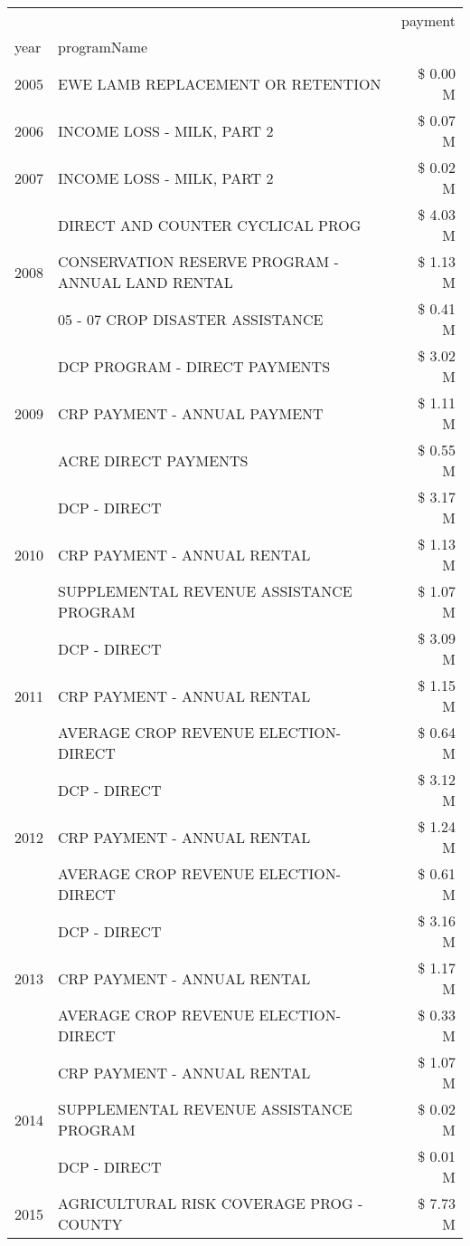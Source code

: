 \begin{tabular}{llr}
\toprule
 &  & payment \\
year & programName &  \\
\midrule
2005 & EWE LAMB REPLACEMENT OR RETENTION & \$ 0.00 M \\
\cline{1-3}
2006 & INCOME LOSS - MILK, PART 2 & \$ 0.07 M \\
\cline{1-3}
2007 & INCOME LOSS - MILK, PART 2 & \$ 0.02 M \\
\cline{1-3}
\multirow[t]{3}{*}{2008} & DIRECT AND COUNTER CYCLICAL PROG & \$ 4.03 M \\
 & CONSERVATION RESERVE PROGRAM - ANNUAL LAND RENTAL & \$ 1.13 M \\
 & 05 - 07 CROP DISASTER ASSISTANCE & \$ 0.41 M \\
\cline{1-3}
\multirow[t]{3}{*}{2009} & DCP PROGRAM - DIRECT PAYMENTS & \$ 3.02 M \\
 & CRP PAYMENT - ANNUAL PAYMENT & \$ 1.11 M \\
 & ACRE DIRECT PAYMENTS & \$ 0.55 M \\
\cline{1-3}
\multirow[t]{3}{*}{2010} & DCP - DIRECT & \$ 3.17 M \\
 & CRP PAYMENT - ANNUAL RENTAL & \$ 1.13 M \\
 & SUPPLEMENTAL REVENUE ASSISTANCE PROGRAM & \$ 1.07 M \\
\cline{1-3}
\multirow[t]{3}{*}{2011} & DCP - DIRECT & \$ 3.09 M \\
 & CRP PAYMENT - ANNUAL RENTAL & \$ 1.15 M \\
 & AVERAGE CROP REVENUE ELECTION-DIRECT & \$ 0.64 M \\
\cline{1-3}
\multirow[t]{3}{*}{2012} & DCP - DIRECT & \$ 3.12 M \\
 & CRP PAYMENT - ANNUAL RENTAL & \$ 1.24 M \\
 & AVERAGE CROP REVENUE ELECTION-DIRECT & \$ 0.61 M \\
\cline{1-3}
\multirow[t]{3}{*}{2013} & DCP - DIRECT & \$ 3.16 M \\
 & CRP PAYMENT - ANNUAL RENTAL & \$ 1.17 M \\
 & AVERAGE CROP REVENUE ELECTION-DIRECT & \$ 0.33 M \\
\cline{1-3}
\multirow[t]{3}{*}{2014} & CRP PAYMENT - ANNUAL RENTAL & \$ 1.07 M \\
 & SUPPLEMENTAL REVENUE ASSISTANCE PROGRAM & \$ 0.02 M \\
 & DCP - DIRECT & \$ 0.01 M \\
\cline{1-3}
\multirow[t]{3}{*}{2015} & AGRICULTURAL RISK COVERAGE PROG - COUNTY & \$ 7.73 M \\

\end{tabular}
